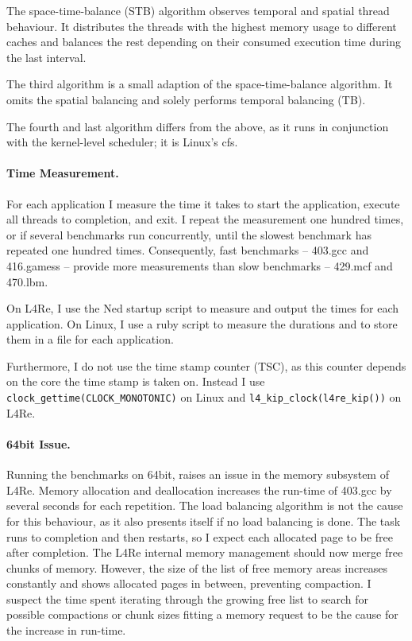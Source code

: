 The space-time-balance (STB) algorithm observes temporal and spatial thread
behaviour.
It distributes the threads with the highest memory usage to different caches
and balances the rest depending on their consumed execution time during the
last interval.

The third algorithm is a small adaption of the space-time-balance algorithm.
It omits the spatial balancing and solely performs temporal balancing (TB).

The fourth and last algorithm differs from the above, as it runs in
conjunction with the kernel-level scheduler; it is Linux's \gls{cfs}.


\paragraph{Time Measurement.}
For each application I measure the time it takes to start the application,
execute all threads to completion, and exit.
I repeat the measurement one hundred times, or if several benchmarks run
concurrently, until the slowest benchmark has repeated one hundred times.
Consequently, fast benchmarks -- 403.gcc and  416.gamess -- provide more
measurements than slow benchmarks -- 429.mcf and 470.lbm.

On L4Re, I use the Ned startup script to measure and output the times for
each application.
On Linux, I use a ruby script to measure the durations and to store them in a
file for each application.

Furthermore, I do not use the time stamp counter (TSC), as this counter depends
on the core the time stamp is taken on.
Instead I use \texttt{clock\_gettime(CLOCK\_MONOTONIC)} on Linux and
\texttt{l4\_kip\_clock(l4re\_kip())} on L4Re.


\paragraph{64bit Issue.}
Running the benchmarks on 64bit, raises an issue in the memory subsystem of L4Re.
Memory allocation and deallocation increases the run-time of 403.gcc by several
seconds for each repetition.
The load balancing algorithm is not the cause for this behaviour, as it also
presents itself if no load balancing is done.
The task runs to completion and then restarts, so I expect each allocated
page to be free after completion.
The L4Re internal memory management should now merge free chunks of memory.
However, the size of the list of free memory areas increases constantly and
shows allocated pages in between, preventing compaction.
I suspect the time spent iterating through the growing free list to search for
possible compactions or chunk sizes fitting a memory request to be the cause
for the increase in run-time.

